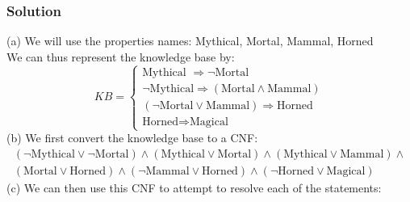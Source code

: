 \documentclass{article}
\begin{document}
\subsubsection*{Solution}
(a) We will use the properties names: Mythical, Mortal, Mammal, Horned \\
We can thus represent the knowledge base by: \begin{equation*}
	KB = 
	\begin{cases}
		\text{Mythical } \Rightarrow  \neg \text{Mortal} \\
		\neg \text{Mythical} \Rightarrow (\text{Mortal} \land \text{Mammal}) \\
		(\neg \text{Mortal} \lor \mbox{Mammal}) \Rightarrow \text{Horned} \\
		\text{Horned} \Rightarrow \text{Magical}
	\end{cases} \end{equation*}
(b) We first convert the knowledge base to a CNF: \begin{multline*}
	(\neg \text{Mythical} \lor \neg \text{Mortal}) \land
	(\text{Mythical} \lor \text{Mortal}) \land (\text{Mythical} \lor \text{Mammal}) \land \\
	(\text{Mortal} \lor \text{Horned}) \land (\neg \text{Mammal}\lor \text{Horned}) \land
	(\neg \text{Horned} \lor \text{Magical}) \end{multline*}
(c) We can then use this CNF to attempt to resolve each of the statements:
\end{document}
